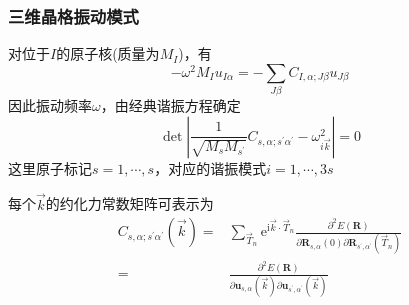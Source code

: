 \frame
{
	\frametitle{三维晶格振动模式}
			对位于$I$的原子核(质量为$M_I$)，有
			\begin{displaymath}
				-\omega^2M_Iu_{I\alpha}=-\sum_{J\beta}C_{I,\alpha;J\beta}u_{J\beta}
			\end{displaymath}
			因此振动频率$\omega$，由经典谐振方程确定
			\begin{displaymath}
				\det\left|\frac1{\sqrt{M_sM_{s^{\prime}}}}C_{s,\alpha;s^{\prime}\alpha^{\prime}}-\omega_{i\vec k}^2\right|=0
			\end{displaymath}
			这里原子标记$s=1,\cdots,s$，对应的谐振模式$i=1,\cdots,3s$

			每个$\vec k$的约化力常数矩阵可表示为
			\begin{displaymath}
				\begin{aligned}
				C_{s,\alpha;s^{\prime}\alpha^{\prime}}(\vec k)=&\sum_{\vec T_n}\mathrm{e}^{\mathrm{i}\vec k\cdot\vec T_n}\frac{\partial^2 E(\mathbf{R})}{\partial\mathbf{R}_{s,\alpha}(0)\partial\mathbf{R}_{s^{\prime},\alpha^{\prime}}(\vec T_n)}\\
				=&\frac{\partial^2E(\mathbf{R})}{\partial\mathbf{u}_{s,\alpha}(\vec k)\partial\mathbf{u}_{s^{\prime},\alpha^{\prime}}(\vec k)} 
				\end{aligned}
			\end{displaymath}
}


